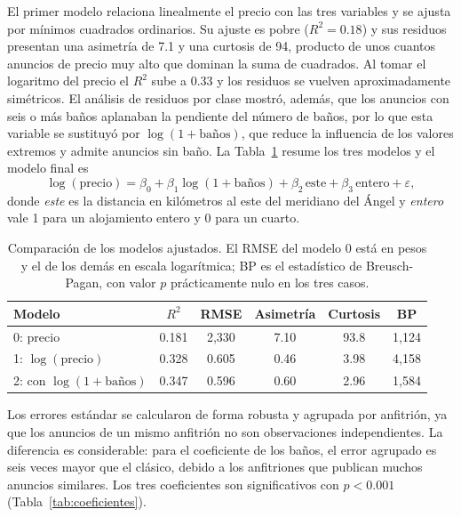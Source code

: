 \documentclass{llncs}
\begin{document}
El primer modelo relaciona linealmente el precio con las tres
variables y se ajusta por mínimos cuadrados ordinarios. Su ajuste es
pobre ($R^2 = 0.18$) y sus residuos presentan una asimetría de 7.1 y
una curtosis de 94, producto de unos cuantos anuncios de precio muy
alto que dominan la suma de cuadrados. Al tomar el logaritmo del precio
el $R^2$ sube a 0.33 y los residuos se vuelven aproximadamente
simétricos. El análisis de residuos por clase mostró, además, que los
anuncios con seis o más baños aplanaban la pendiente del número de
baños, por lo que esta variable se sustituyó por
$\log(1 + \text{baños})$, que reduce la influencia de los valores
extremos y admite anuncios sin baño. La Tabla~\ref{tab:modelos} resume
los tres modelos y el modelo final es
\begin{equation}
\log(\text{precio}) = \beta_0 + \beta_1 \log(1 + \text{baños})
+ \beta_2\,\text{este} + \beta_3\,\text{entero} + \varepsilon ,
\label{eq:final}
\end{equation}
donde \emph{este} es la distancia en kilómetros al este del meridiano
del Ángel y \emph{entero} vale 1 para un alojamiento entero y 0 para
un cuarto.

\begin{table}[h]
\caption{Comparación de los modelos ajustados. El RMSE del modelo 0
está en pesos y el de los demás en escala logarítmica; BP es el
estadístico de Breusch-Pagan, con valor $p$ prácticamente nulo en los
tres casos.}
\label{tab:modelos}
\centering
\begin{tabular}{@{}lccccc@{}}
\toprule
Modelo & $R^2$ & RMSE & Asimetría & Curtosis & BP \\
\midrule
0: precio & 0.181 & 2,330 & 7.10 & 93.8 & 1,124 \\
1: $\log(\text{precio})$ & 0.328 & 0.605 & 0.46 & 3.98 & 4,158 \\
2: con $\log(1 + \text{baños})$ & 0.347 & 0.596 & 0.60 & 2.96 & 1,584 \\
\bottomrule
\end{tabular}
\end{table}

Los errores estándar se calcularon de forma robusta y agrupada por
anfitrión, ya que los anuncios de un mismo anfitrión no son
observaciones independientes. La diferencia es considerable: para el
coeficiente de los baños, el error agrupado es seis veces mayor que el
clásico, debido a los anfitriones que publican muchos anuncios
similares. Los tres coeficientes son significativos con $p < 0.001$
(Tabla~\ref{tab:coeficientes}).
\end{document}
